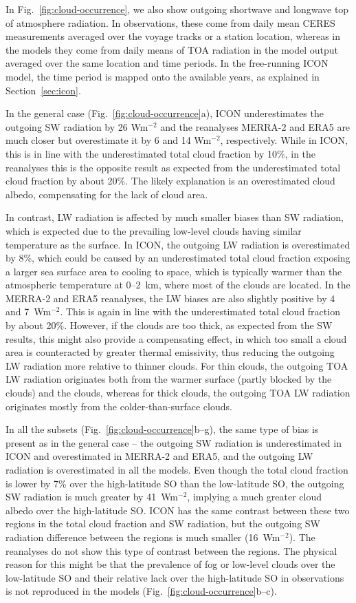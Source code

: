 \documentclass[draft]{agujournal2019}
\begin{document}
In Fig.~\ref{fig:cloud-occurrence}, we also show outgoing shortwave and longwave top of atmosphere radiation. In observations, these come from daily mean CERES measurements averaged over the voyage tracks or a station location, whereas in the models they come from daily means of TOA radiation in the model output averaged over the same location and time periods. In the free-running ICON model, the time period is mapped onto the available years, as explained in Section~\ref{sec:icon}.

In the general case (Fig.~\ref{fig:cloud-occurrence}a), ICON underestimates the outgoing SW radiation by 26 Wm$^{-2}$ and the reanalyses MERRA-2 and ERA5 are much closer but overestimate it by 6 and 14 Wm$^{-2}$, respectively. While in ICON, this is in line with the underestimated total cloud fraction by 10\%, in the reanalyses this is the opposite result as expected from the underestimated total cloud fraction by about 20\%. The likely explanation is an overestimated cloud albedo, compensating for the lack of cloud area.

In contrast, LW radiation is affected by much smaller biases than SW radiation, which is expected due to the prevailing low-level clouds having similar temperature as the surface. In ICON, the outgoing LW radiation is overestimated by 8\%, which could be caused by an underestimated total cloud fraction exposing a larger sea surface area to cooling to space, which is typically warmer than the atmospheric temperature at 0--2~km, where most of the clouds are located. In the MERRA-2 and ERA5 reanalyses, the LW biases are also slightly positive by 4 and 7~Wm$^{-2}$. This is again in line with the underestimated total cloud fraction by about 20\%. However, if the clouds are too thick, as expected from the SW results, this might also provide a compensating effect, in which too small a cloud area is counteracted by greater thermal emissivity, thus reducing the outgoing LW radiation more relative to thinner clouds. For thin clouds, the outgoing TOA LW radiation originates both from the warmer surface (partly blocked by the clouds) and the clouds, whereas for thick clouds, the outgoing TOA LW radiation originates mostly from the colder-than-surface clouds.

In all the subsets (Fig.~\ref{fig:cloud-occurrence}b--g), the same type of bias is present as in the general case -- the outgoing SW radiation is underestimated in ICON and overestimated in MERRA-2 and ERA5, and the outgoing LW radiation is overestimated in all the models. Even though the total cloud fraction is lower by 7\% over the high-latitude SO than the low-latitude SO, the outgoing SW radiation is much greater by 41~Wm$^{-2}$, implying a much greater cloud albedo over the high-latitude SO. ICON has the same contrast between these two regions in the total cloud fraction and SW radiation, but the outgoing SW radiation difference between the regions is much smaller (16~Wm$^{-2}$). The reanalyses do not show this type of contrast between the regions. The physical reason for this might be that the prevalence of fog or low-level clouds over the low-latitude SO and their relative lack over the high-latitude SO in observations is not reproduced in the models (Fig.~\ref{fig:cloud-occurrence}b--c).
\end{document}
